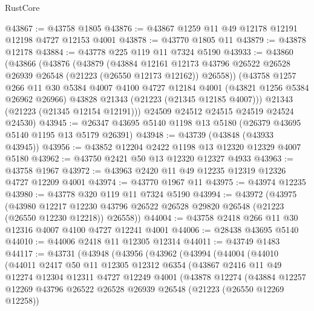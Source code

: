 \begin{lexlean}{RustCore}
\begin{coremodule}
@43867 := @43758 @1805
@43876 := @43867 @1259 @11 @49 @12178 @12191 @12198 @4727 @12153 @4001
@43878 := @43770 @1805 @11
@43879 := @43878 @12178
@43884 := @43778 @225 @119 @11 @7324 @5190
@43933 := @43860
    (@43866
      (@43876
        (@43879
          (@43884
            @12161
            @12173
            @43796
            @26522
            @26528
            @26939
            @26548
            (@21223 (@26550 @12173 @12162))
            @26558))
        (@43758
          @1257
          @266
          @11
          @30
          @5384
          @4007
          @4100
          @4727
          @12184
          @4001
          (@43821 @1256 @5384 @26962 @26966)
          @43828
          @21343
          (@21223 (@21345 @12185 @4007)))
        @21343
        (@21223 (@21345 @12154 @12191)))
      @24509
      @24512
      @24515
      @24519
      @24524
      @24530)
@43945 := @26347 @43695 @5140 @1198 @13 @5180 (@26379 @43695 @5140 @1195 @13 @5179 @26391)
@43948 := @43739 (@43848 (@43933 @43945))
@43956 := @43852 @12204 @2422 @1198 @13 @12320 @12329 @4007 @5180
@43962 := @43750 @2421 @50 @13 @12320 @12327 @4933
@43963 := @43758 @1967
@43972 := @43963 @2420 @11 @49 @12235 @12319 @12326 @4727 @12209 @4001
@43974 := @43770 @1967 @11
@43975 := @43974 @12235
@43980 := @43778 @320 @119 @11 @7324 @5190
@43994 := @43972
    (@43975
      (@43980
        @12217
        @12230
        @43796
        @26522
        @26528
        @29820
        @26548
        (@21223 (@26550 @12230 @12218))
        @26558))
@44004 := @43758 @2418 @266 @11 @30 @12316 @4007 @4100 @4727 @12241 @4001
@44006 := @28438 @43695 @5140
@44010 := @44006 @2418 @11 @12305 @12314
@44011 := @43749 @1483
@44117 := @43731
    (@43948
      (@43956
        (@43962
          (@43994
            (@44004
              (@44010
                (@44011
                  @2417
                  @50
                  @11
                  @12305
                  @12312
                  @6354
                  (@43867
                    @2416
                    @11
                    @49
                    @12274
                    @12304
                    @12311
                    @4727
                    @12249
                    @4001
                    (@43878
                      @12274
                      (@43884
                        @12257
                        @12269
                        @43796
                        @26522
                        @26528
                        @26939
                        @26548
                        (@21223 (@26550 @12269 @12258))

\end{coremodule}
\end{lexlean}
